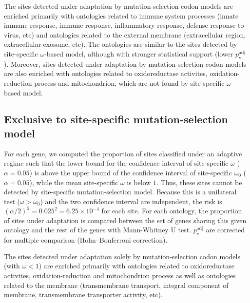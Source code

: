 \documentclass{article}
\begin{document}
    \begin{center}
        \footnotesize
        
    \end{center}
    The sites detected under adaptation by mutation-selection codon models are enriched primarily with ontologies related to immune system processes (innate immune response, immune response, inflammatory response, defense response to virus, etc) and ontologies related to the external membrane (extracellular region, extracellular exosome, etc).
    The ontologies are similar to the sites detected by site-specific $\omega$-based model, although with stronger statistical support (lower $p_{\mathrm{v}}^{\mathrm{adj}}$).
    Moreover, sites detected under adaptation by mutation-selection codon models are also enriched with ontologies related to oxidoreductase activites, oxidation-reduction process and mitochondrion, which are not found by site-specific $\omega$-based model.

    \subsection{Exclusive to site-specific mutation-selection model}
    \label{subsec:exclusive-to-mutation-selection-codon-method}

    For each gene, we computed the proportion of sites classified under an adaptive regime such that the lower bound for the confidence interval of site-specific $\omega$ ($\alpha=0.05$) is above the upper bound of the confidence interval of site-specific $\omega_{0}$ ($\alpha=0.05$), while the mean site-specific $\omega$ is below $1$.
    Thus, these sites cannot be detected by site-specific mutation-selection model.
    Because this is a unilateral test ($\omega > \omega_{0}$) and the two confidence interval are independent, the risk is $(\alpha/2)^2=0.025^2=6.25 \times 10^{-4}$ for each site.
    For each ontology, the proportion of sites under adaptation is compared between the set of genes sharing this given ontology and the rest of the genes with Mann-Whitney U test.
    $p_{\mathrm{v}}^{\mathrm{adj}}$ are corrected for multiple comparison (Holm–Bonferroni correction).

    \begin{center}
        \footnotesize
        
    \end{center}

    The sites detected under adaptation solely by mutation-selection codon models (with $\omega < 1$) are enriched primarily with ontologies related to oxidoreductase activites, oxidation-reduction and mitochondrion process as well as ontologies related to the membrane (transmembrane transport, integral component of membrane, transmembrane transporter activity, etc).
\end{document}
